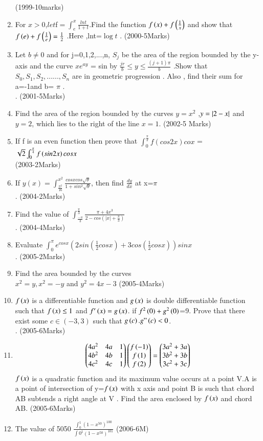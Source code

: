\documentclass[journal,12pt,twocolumn]{IEEEtran}
\theoremstyle{remark}
\begin{document}
\begin{enumerate}
\hfill{(1999-10marks)}\\
\item For $x > 0 $,$let $f$=\int_{e}^{x}\frac{lnt}{1+t}$.Find the function $f\left(x\right) + f\left(\frac{1}{x}\right)$
	and show that $f\left(e\right)+f\left(\frac{1}{e}\right)=
\frac{1}{2}$ .Here ,lnt=$\log t$ .
\hfill{(2000-5Marks)}
\item Let $b\neq0$ and for j=0,1,2,...,n, $S_j$ be the area of the region bounded by the y-axis and the curve $xe^{ay}$ = sin by $\frac{jr}{b} \le y \le \frac{(j+1)\pi}{b}$ .Show that  $S_0,S_1,S_2,......,S_n$ are in geometric progression . Also , find their sum for a=-1and b= $\pi$ .\\.
\hfill{(2001-5Marks)}
\item Find the area of the region bounded by the curves $y=x^2$ ,$y=\left\vert2-x\right\vert$ and $y=2$, which lies to the right of the line $x=1$.
\hfill{(2002-5 Marks)}
\item If f is an even function then prove that 	$\int_{0}^{\frac{\pi}{2}}f(cos2x)cox $ =$\sqrt{2}\int_{0}^{\frac{\pi}{4}}f\left(sin2x\right)cosx$\\						
\hfill{(2003-2Marks)}
\item If $y(x)=\int_{\frac{\pi^2}{16}}^{x^2}\frac{cosxcos\sqrt{\theta}}{1+sin^2\sqrt{\theta}}$, then find $\frac{dy}{dx}$ at x=$\pi$\\.
\hfill{(2004-2Marks)}
\item  Find the value of $\int_{\frac{-\pi}{3}}^{\frac{\pi}{3}}\frac{\pi+4x^3}{2-cos(|x|+\frac{\pi}{3})}$\\.
\hfill{(2004-4Marks)}
\item Evaluate $\int_{0}^{\pi}e^{cosx}(2sin(\frac{1}{2}cosx)+3cos(\frac{1}{2}cosx))sinx$\\.
\hfill{(2005-2Marks)}
\item Find the area bounded by the curves \\  
$x^2=y,x^2=-y$ and $y^2=4x-3$
\hfill{(2005-4Marks)}
\item  $f\left(x\right)$ is a differentiable function and $g\left(x\right)$ is  double differentiable function such that $f\left(x\right)\le1$ and $f'\left(x\right)=g\left(x\right)$. if $f^2\left(0\right)+g^2\left(0\right)$=9. Prove that there exist some $c\in(-3,3)$ such that $g\left(c\right).g"\left(c\right)<0$.\\.
\hfill{(2005-6Marks)}
\item 
  \[
\begin{pmatrix} 4a^2 & 4a & 1\\4b^2 & 4b & 1\\4c^2 & 4c & 1\end{pmatrix}
\begin{pmatrix}f\left(-1\right)\\f\left(1\right)\\f\left(2\right)\end{pmatrix} =
\begin{pmatrix}3a^2+3a\\3b^2+3b\\3c^2+3c\end{pmatrix}
\]
		$f\left(x\right)$ is a quadratic function and its maximum value occurs at a point V.A is a point of intersection of y=$f\left(x\right)$ with x axis and point B is such that chord AB subtends a right angle at V . Find the area enclosed by $f\left(x\right)$ and chord AB.
\hfill{(2005-6Marks)}
\item The value of 5050 $\frac{\int_{0}^{1}(1-x^50)^100}{\int{0}^{1} {(1-x^50)^101}}$
\hfill{(2006-6M)}


\end{enumerate}
\end{document}
